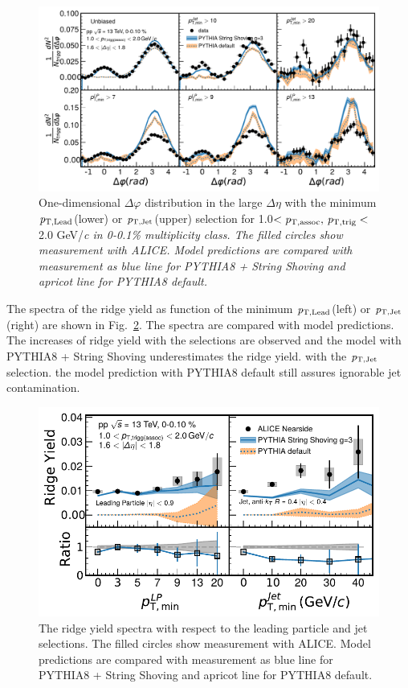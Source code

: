\begin{figure}[h!]
	\centering
	\includegraphics[width=0.99\linewidth]{./figures/Fig5_PlotDeltaPhiESE.pdf}
	\caption{ One-dimensional $\Delta\varphi$ distribution in the large $\Delta\eta$ with the minimum $\it{p}_{\rm{T, Lead}}$(lower) or $\it{p}_{\rm{T, Jet}}$(upper) selection for 1.0$<\it{p}_{\rm{T, assoc}},\,\it{p}_{\rm{T, trig}}<$2.0 GeV/\it{c}\rm{} in 0-0.1\% multiplicity class. The filled circles show measurement with ALICE. Model predictions are compared with measurement as blue line for PYTHIA8 + String Shoving  and apricot line for PYTHIA8 default.}
	\label{fig:PlotDeltaPhiESE}
\end{figure}

The spectra of the ridge yield as function of the minimum $\it{p}_{\rm{T, Lead}}$(left) or $\it{p}_{\rm{T, Jet}}$(right) are shown in Fig.~\ref{fig:RidgeYield_ESE}. The spectra are compared with model predictions. 
The increases of ridge yield with the selections are observed and the model with PYTHIA8 + String Shoving underestimates the ridge yield. with the $\it{p}_{\rm{T, Jet}}$ selection. the model prediction with PYTHIA8 default still assures ignorable jet contamination.

\begin{figure}[h!]
	\centering
	\includegraphics[width=0.99\linewidth]{./figures/Fig6_RidgeYieldESE.pdf}
	\caption{The ridge yield spectra with respect to the leading particle and jet selections. The filled circles show measurement with ALICE. Model predictions are compared with measurement as blue line for PYTHIA8 + String Shoving  and apricot line for PYTHIA8 default.}
	\label{fig:RidgeYield_ESE}
\end{figure}



